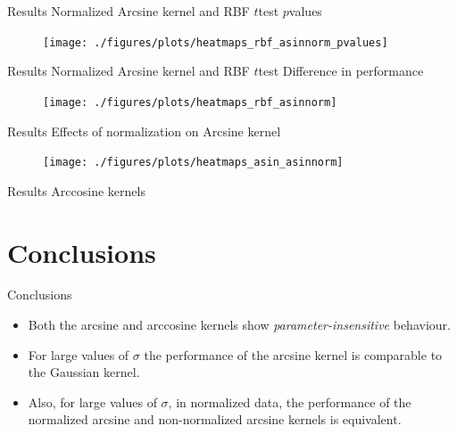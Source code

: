 \documentclass[aspectratio=169]{beamer}
\begin{document}
\begin{frame}{Results \textendash{} Normalized Arcsine kernel and RBF \textendash{} $t$\textendash{}test}
	\centering $p$\textendash{}values
	\begin{figure}[H]
		\texttt{[image: ./figures/plots/heatmaps\_rbf\_asinnorm\_pvalues]}
	\end{figure}
\end{frame}

\begin{frame}{Results \textendash{} Normalized Arcsine kernel and RBF \textendash{} $t$\textendash{}test}
	\centering Difference in performance
	\begin{figure}[H]
		\texttt{[image: ./figures/plots/heatmaps\_rbf\_asinnorm]}
	\end{figure}
\end{frame}


\begin{frame}{Results \textendash{} Effects of normalization on Arcsine kernel}
	\begin{figure}[H]
		\texttt{[image: ./figures/plots/heatmaps\_asin\_asinnorm]}
	\end{figure}
\end{frame}

\begin{frame}{Results \textendash{} Arccosine kernels}
\end{frame}

\section{Conclusions}

\begin{frame}{Conclusions}
	\begin{itemize}%
		\item Both the arcsine and arccosine kernels show \emph{parameter-insensitive} behaviour.
		\item For large values of $\sigma$ the performance of the arcsine kernel is
		      comparable to the Gaussian kernel.
		\item Also, for large values of $\sigma$, in normalized data, the performance
		      of the normalized arcsine and non-normalized arcsine kernels is equivalent.
	\end{itemize}
\end{frame}
\end{document}
